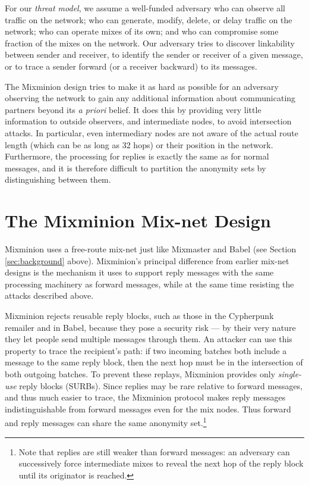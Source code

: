 \documentclass[11pt]{IEEEtran}
\begin{document}
For our \emph{threat model}, we assume a well-funded adversary who can 
observe all traffic on the
network; who can generate, modify, delete, or delay traffic on the
network; who can operate mixes of its own; and who can compromise some
fraction of the mixes on the network. Our adversary tries to discover
linkability between sender and receiver, to identify the sender or
receiver of a given message, or to trace a sender forward (or a receiver
backward) to its messages.

The Mixminion design tries to make it as hard as possible for an
adversary observing the network to gain any additional information
about communicating partners beyond its \emph{a priori} belief. It does
this by providing very little information to outside observers, and
intermediate nodes, to avoid intersection attacks. In particular, even
intermediary nodes are not aware of the actual route length (which can
be as long as 32 hops) or their position in the network. Furthermore,
the processing for replies is exactly the same as for normal messages,
and it is therefore difficult to partition the anonymity sets by
distinguishing between them. 



\section{The Mixminion Mix-net Design}

\label{sec:design}

Mixminion uses a free-route mix-net just like Mixmaster \cite{mixmaster-spec}
and Babel \cite{babel} (see Section \ref{sec:background} above). 
Mixminion's principal difference from earlier mix-net
designs is the mechanism it uses to support reply messages with the
same processing machinery as forward messages, while at the same time
resisting the attacks described above.

Mixminion rejects reusable reply blocks, such as those in the Cypherpunk
remailer and in Babel, because they pose a security risk --- by their very
nature they let people send multiple
messages through them.  An attacker can use this property to
trace the recipient's path: if two incoming batches both include a
message to the same reply block, then the next hop must be in the
intersection of both outgoing batches.  To prevent these replays,
Mixminion provides only \emph{single-use} reply blocks (SURBs). Since
replies may be rare relative to forward messages, and thus
much easier to trace, the Mixminion protocol makes reply messages
indistinguishable from forward messages even for the mix nodes. Thus
forward and reply messages can share the same anonymity
set.\footnote{Note that replies are still weaker than forward messages:
an adversary can successively force intermediate mixes to reveal the
next hop of the reply block until its originator is reached.}
\end{document}
